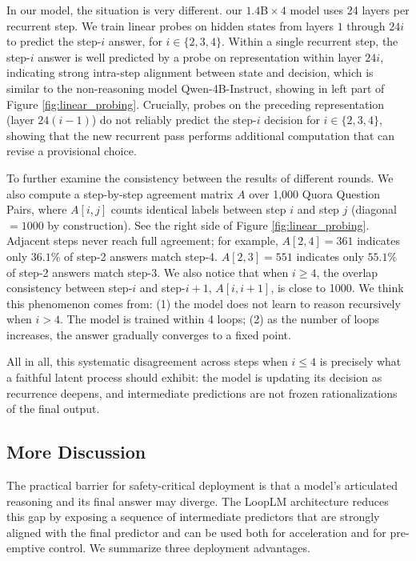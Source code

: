 \documentclass[]{bytedance_seed}
\newcommand{\1}{\mathbf{1}}
\newcommand{\ut}{LoopLM}
\begin{document}
{In our model, the situation is very different. our $1.4\mathrm{B}\!\times\!4$ model uses 24 layers per recurrent step. 
We train linear probes on hidden states from layers $1$ through $24i$ to predict the step-$i$ answer, for $i\!\in\!\{2,3,4\}$. Within a single recurrent step, the step-$i$ answer is well predicted by a probe on representation within layer $24i$, indicating strong intra-step alignment between state and decision, which is similar to the non-reasoning model Qwen-4B-Instruct, showing in left part of Figure \ref{fig:linear_probing}.
Crucially, probes on the preceding representation (layer $24(i\!-\!1)$) do not reliably predict the step-$i$ decision for $i\!\in\!\{2,3,4\}$, showing that the new recurrent pass performs additional computation that can revise a provisional choice.

To further examine the consistency between the results of different rounds. We also compute a step-by-step agreement matrix $A$ over 1{,}000 Quora Question Pairs, where $A[i,j]$ counts identical labels between step $i$ and step $j$ (diagonal $=\!1000$ by construction). See the right side of Figure \ref{fig:linear_probing}.
Adjacent steps never reach full agreement; for example, $A[2,4]\!=\!361$ indicates only $36.1\%$ of step-2 answers match step-4. $A[2,3]\!=\!551$ indicates only $55
.1\%$ of step-2 answers match step-3. We also notice that when $i\geq4$, the overlap consistency between step-$i$ and step-$i+1$, $A[i,i+1]$, is close to 1000. We think this phenomenon comes from: (1) the model does not learn to reason recursively when $i>4$. The model is trained within 4 loops; (2) as the number of loops increases, the answer gradually converges to a fixed point.

All in all, this systematic disagreement across steps when $i\leq4$ is precisely what a faithful latent process should exhibit: the model is updating its decision as recurrence deepens, and intermediate predictions are not frozen rationalizations of the final output.

\subsection{More Discussion}

The practical barrier for safety-critical deployment is that a model’s articulated reasoning and its final answer may diverge. The \ut{} architecture reduces this gap by exposing a sequence of intermediate predictors that are strongly aligned with the final predictor and can be used both for acceleration and for pre-emptive control. We summarize three deployment advantages.

}
\end{document}
